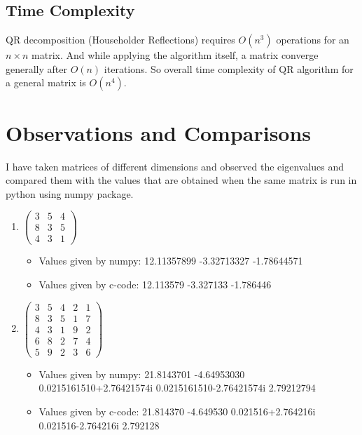 \documentclass[a4paper, 14pt]{article}
\begin{document}
\subsection*{Time Complexity}
QR decomposition (Householder Reflections) requires $O(n^3)$ operations for an $n \times n $ matrix. And while applying the algorithm itself, a matrix converge generally after $O(n)$ iterations. So overall time complexity of QR algorithm for a general matrix is $O(n^4)$. 
\pagebreak
\section*{Observations and Comparisons}
I have taken matrices of different dimensions and observed the eigenvalues and compared them with the values that are obtained when the same matrix is run in python using numpy package.
\begin{enumerate}
\item $
\begin{pmatrix}
3 & 5 & 4 \\
8 & 3 & 5 \\
4 & 3 & 1
\end{pmatrix}
$
\begin{itemize}
	\item Values given by numpy: 12.11357899  -3.32713327 -1.78644571
	\item Values given by c-code: 12.113579  -3.327133  -1.786446
\end{itemize}

\item $\begin{pmatrix}
3 & 5 & 4 & 2 & 1 \\
8 & 3 & 5 & 1 & 7 \\
4 & 3 & 1 & 9 & 2 \\
6 & 8 & 2 & 7 & 4 \\
5 & 9 & 2 & 3 & 6
\end{pmatrix}$
\begin{itemize}
	\item Values given by numpy: 21.8143701  -4.64953030  0.0215161510+2.76421574i  0.0215161510-2.76421574i  2.79212794
	\item Values given by c-code: 21.814370  -4.649530  0.021516+2.764216i  0.021516-2.764216i  2.792128
\end{itemize}


\end{enumerate}
\end{document}
